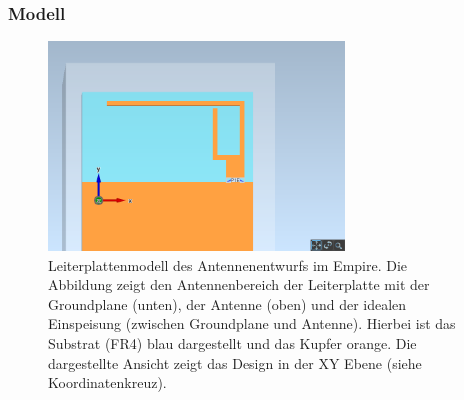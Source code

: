 \subsubsection{Modell}

\begin{figure}[h!]
	\centering
	\includegraphics[width=0.7\textwidth]{../fig/plt/crazy_stuff_l4_pcb_v2c_laptop_1a_105_5ghz_3d_pcb_xy.png}
	\caption[Leiterplattenmodell des Antennenentwurfs im Empire.]{
		Leiterplattenmodell des Antennenentwurfs im Empire.
		Die Abbildung zeigt den Antennenbereich der Leiterplatte
		mit der Groundplane (unten), der Antenne (oben) und der
		idealen Einspeisung (zwischen Groundplane und Antenne).
		Hierbei ist das Substrat (FR4) blau dargestellt und das
		Kupfer orange. Die dargestellte Ansicht zeigt das
		Design in der XY Ebene (siehe Koordinatenkreuz).}	
	\label{fig:modell}
\end{figure}

